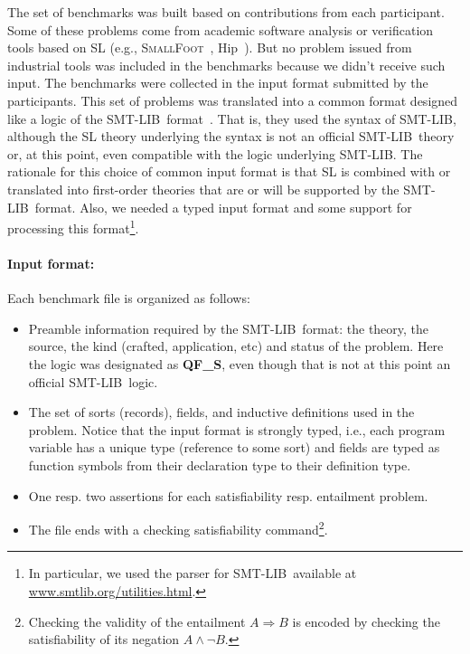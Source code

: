 \documentclass[twoside,11pt]{article}
\newcommand{\limp}{\Rightarrow}
\newcommand{\smtlib}{\textsf{SMT-LIB}}
\begin{document}
The set of benchmarks was built based on contributions from each participant. 
Some of these problems come from academic software analysis or verification tools based on SL 
(e.g., \textsc{SmallFoot}~\cite{SmallFootsite}, \textsf{Hip}~\cite{ChinDNQ12}).
But no problem issued from industrial tools was included in the benchmarks because we didn't receive such input.
The benchmarks were collected in the input format submitted by the participants. 
This set of problems was translated into a common format designed like a logic of the \smtlib\ format~\cite{BarST-SMTLIB}.
That is, they used the syntax of \smtlib, although the SL theory underlying the syntax is not an official \smtlib\ theory or, at this point, even compatible with the logic underlying \smtlib.
The rationale for this choice of common input format is 
that SL is combined with or translated into first-order theories that are or will be supported by the \smtlib\ format.
Also, we needed a typed input format and some support for processing this format\footnote{In particular, we used the parser for \smtlib\ available at \url{www.smtlib.org/utilities.html}.}.
 
\paragraph{Input format:} Each benchmark file is organized as follows:
\begin{itemize}
\item Preamble information required by the \smtlib\ format: the theory, the source, the kind (crafted, application, etc) and status of the problem.  Here the logic was designated as \textbf{QF\_S}, even though that is not at this point an official \smtlib\ logic. 
\item The set of sorts (records), fields, and inductive definitions used in the problem. Notice that the input format is strongly typed, i.e., each program variable has a unique type (reference to some sort) and 
fields are typed as function symbols from their declaration type to their definition type. 
\item One resp. two assertions for each satisfiability resp. entailment problem. 
\item The file ends with a checking satisfiability command\footnote{Checking the validity of the entailment $A\limp B$ is encoded by checking the satisfiability of its negation $A \land \lnot B$.}.
\end{itemize}
\end{document}
